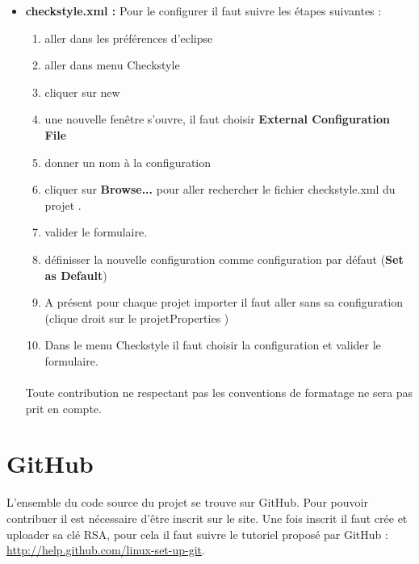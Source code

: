 \begin{itemize}
	\item  \textbf{checkstyle.xml :}
		Pour le configurer il faut suivre les étapes suivantes :
		\begin{enumerate}
				\item aller dans les préférences d'eclipse
				\item aller dans menu Checkstyle
				\item cliquer sur new
				\item une nouvelle fenêtre s'ouvre, il faut choisir \textbf{External Configuration File}
				\item donner un nom à la configuration
				\item cliquer sur \textbf{Browse...} pour aller rechercher le fichier checkstyle.xml du projet \youTestIt{}.
				\item valider le formulaire.
				\item définisser la nouvelle configuration comme configuration par défaut (\textbf{Set as Default})
				\item A présent pour chaque projet importer il faut aller sans sa configuration 
							(clique droit sur le projet\rightArrow{}Properties )
				\item Dans le menu Checkstyle  il faut choisir la configuration  \youTestIt{} et valider le formulaire.
		\end{enumerate}
	

	\paragraph{}	
	
	\begin{attention}
		Toute contribution ne respectant pas les conventions de formatage ne sera pas prit en compte.
	\end{attention}
	
\end{itemize}
\section{GitHub}
L'ensemble du code source du projet se trouve sur GitHub. Pour pouvoir contribuer il est
nécessaire d’être inscrit sur le site.  Une fois inscrit il faut crée et uploader sa clé RSA, pour cela il faut suivre le tutoriel proposé 
par GitHub : \href{http://help.github.com/linux-set-up-git/ }{http://help.github.com/linux-set-up-git}. 

